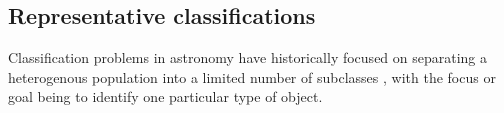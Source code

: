 \subsection{Representative classifications}
\label{sec:realdata}

Classification problems in astronomy have historically focused on separating a heterogenous population into a limited number of subclasses \citep{kessler_results_2010}, with the focus or goal being to identify one particular type of object.

%
%
%

